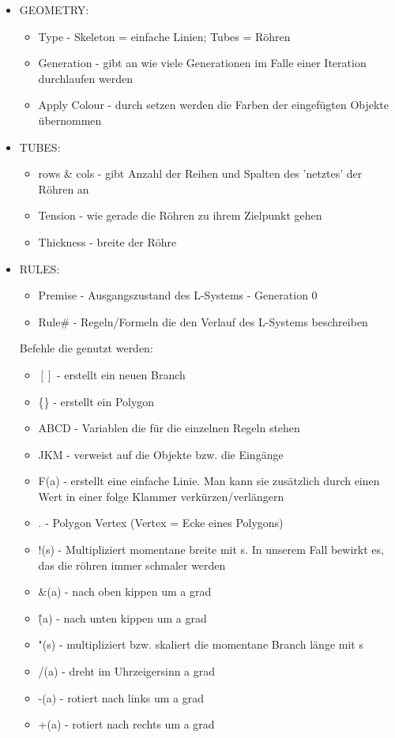 \documentclass[paper=a4,fontsize=12pt,ngerman]{scrartcl}
\begin{document}
	\begin{itemize}
		\item GEOMETRY:
		\begin{itemize}
			\item Type - Skeleton = einfache Linien; Tubes = Röhren
			\item Generation - gibt an wie viele Generationen im Falle einer Iteration durchlaufen werden
			\item Apply Colour - durch setzen werden die Farben der eingefügten Objekte übernommen
		\end{itemize}
		\item TUBES:
		\begin{itemize}
			\item rows \& cols - gibt Anzahl der Reihen und Spalten des 'netztes' der Röhren an
			\item Tension - wie gerade die Röhren zu ihrem Zielpunkt gehen
			\item Thickness - breite der Röhre
		\end{itemize}
		\item RULES:		
		\begin{itemize}
			\item Premise - Ausgangszustand des L-Systems - Generation 0
			\item Rule\#  - Regeln/Formeln die den Verlauf des L-Systems beschreiben
		\end{itemize}
		Befehle die genutzt werden:  
		\begin{itemize}
			\item $[]$ - erstellt ein neuen Branch
			\item \{\} - erstellt ein Polygon
			\item ABCD - Variablen die für die einzelnen Regeln stehen
			\item JKM - verweist auf die Objekte bzw. die Eingänge 
			\item F(a) - erstellt eine einfache Linie. Man kann sie zusätzlich durch einen Wert in einer folge Klammer verkürzen/verlängern
			\item .  - Polygon Vertex (Vertex = Ecke eines Polygons)
			\item !(s) - Multipliziert momentane breite mit s. In unserem Fall bewirkt es, das die röhren immer schmaler werden
			\item \&(a) - nach oben kippen um a grad
			\item \^(a) - nach unten kippen um a grad
			\item "(s) - multipliziert bzw. skaliert die momentane Branch länge mit s
			\item /(a) - dreht im Uhrzeigersinn a grad
			\item -(a) - rotiert nach links um a grad
			\item +(a) - rotiert nach rechts um a grad
		\end{itemize}
	\end{itemize}
\end{document}
